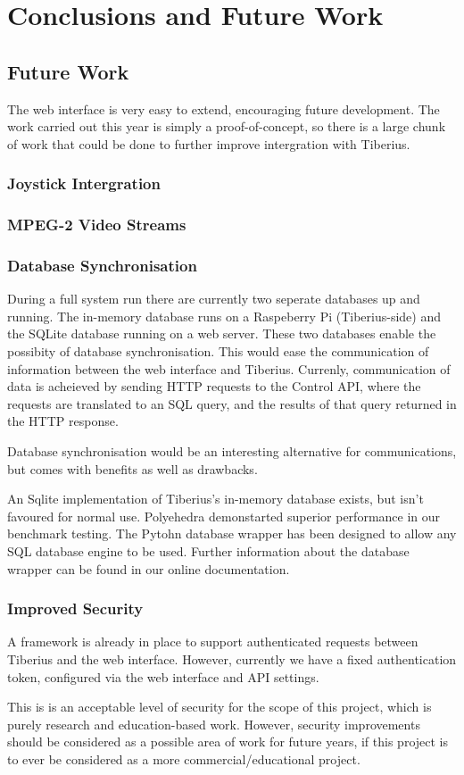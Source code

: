\section{Conclusions and Future Work}

\subsection{Future Work}
The web interface is very easy to extend, encouraging future development.
The work carried out this year is simply a proof-of-concept, so there is a large
chunk of work that could be done to further improve intergration with Tiberius.

\subsubsection{Joystick Intergration}

\subsubsection{MPEG-2 Video Streams}

\subsubsection{Database Synchronisation}
During a full system run there are currently two seperate databases up and
running. The in-memory database runs on a Raspeberry Pi (Tiberius-side) and the
SQLite database running on a web server. These two databases enable the
possibity of database synchronisation. This would ease the communication of
information between the web interface and Tiberius. Currenly, communication of
data is acheieved by sending HTTP requests to the Control API, where the
requests are translated to an SQL query, and the results of that query returned
in the HTTP response.

Database synchronisation would be an interesting alternative for communications,
but comes with benefits as well as drawbacks.

An Sqlite implementation of Tiberius's in-memory database exists, but isn't
favoured for normal use. Polyehedra demonstarted superior performance in
our benchmark testing. The Pytohn database wrapper has been designed to allow
any SQL database engine to be used. Further information about the database
wrapper can be found in our online documentation.


\subsubsection{Improved Security}
A framework is already in place to support authenticated requests between
Tiberius and the web interface. However, currently we have a fixed
authentication token, configured via the web interface and API settings.

This is is an acceptable level of security for the scope of this project, which
is purely research and education-based work. However, security improvements
should be considered as a possible area of work for future years, if this
project is to ever be considered as a more commercial/educational project.
